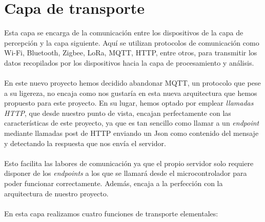 \documentclass[12pt]{report}
\begin{document}
\section{Capa de transporte} 
Esta capa se encarga de la comunicación entre los dispositivos de la capa de percepción y la capa siguiente. Aquí se utilizan protocolos de comunicación como Wi-Fi, Bluetooth, Zigbee, LoRa, MQTT, HTTP, entre otros, para transmitir los datos recopilados por los dispositivos hacia la capa de procesamiento y análisis.
\\\\
En este nuevo proyecto hemos decidido abandonar MQTT, un protocolo que pese a su ligereza, no encaja como nos gustaría en esta nueva arquitectura que hemos propuesto para este proyecto. 
En su lugar, hemos optado por emplear \textit{llamadas HTTP}, que desde nuestro punto de vista, encajan perfectamente con las características de este proyecto, ya que es tan sencillo como llamar a un \textit{endpoint} mediante llamadas post de HTTP enviando un Json como contenido del mensaje y detectando la respuesta que nos envía el servidor. 
\\\\
Esto facilita las labores de comunicación ya que el propio servidor solo requiere disponer de los \textit{endpoints} a los que se llamará desde el microcontrolador para poder funcionar correctamente. Además, encaja a la perfección con la arquitectura de nuestro proyecto.
\\\\
En esta capa realizamos cuatro funciones de transporte elementales:
\end{document}
